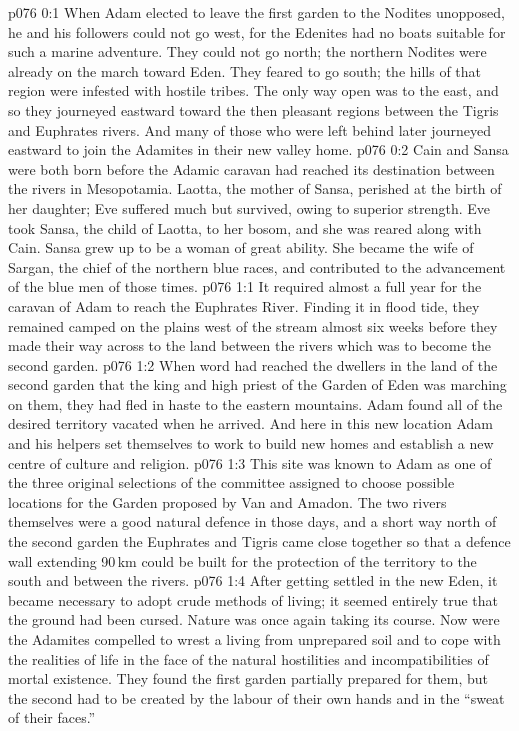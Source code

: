 \author{Solonia}
\vs p076 0:1 When Adam elected to leave the first garden to the Nodites unopposed, he and his followers could not go west, for the Edenites had no boats suitable for such a marine adventure. They could not go north; the northern Nodites were already on the march toward Eden. They feared to go south; the hills of that region were infested with hostile tribes. The only way open was to the east, and so they journeyed eastward toward the then pleasant regions between the Tigris and Euphrates rivers. And many of those who were left behind later journeyed eastward to join the Adamites in their new valley home.
\vs p076 0:2 \pc Cain and Sansa were both born before the Adamic caravan had reached its destination between the rivers in Mesopotamia. Laotta, the mother of Sansa, perished at the birth of her daughter; Eve suffered much but survived, owing to superior strength. Eve took Sansa, the child of Laotta, to her bosom, and she was reared along with Cain. Sansa grew up to be a woman of great ability. She became the wife of Sargan, the chief of the northern blue races, and contributed to the advancement of the blue men of those times.
\vs p076 1:1 It required almost a full year for the caravan of Adam to reach the Euphrates River. Finding it in flood tide, they remained camped on the plains west of the stream almost six weeks before they made their way across to the land between the rivers which was to become the second garden.
\vs p076 1:2 When word had reached the dwellers in the land of the second garden that the king and high priest of the Garden of Eden was marching on them, they had fled in haste to the eastern mountains. Adam found all of the desired territory vacated when he arrived. And here in this new location Adam and his helpers set themselves to work to build new homes and establish a new centre of culture and religion.
\vs p076 1:3 This site was known to Adam as one of the three original selections of the committee assigned to choose possible locations for the Garden proposed by Van and Amadon. The two rivers themselves were a good natural defence in those days, and a short way north of the second garden the Euphrates and Tigris came close together so that a defence wall extending 90\,km could be built for the protection of the territory to the south and between the rivers.
\vs p076 1:4 \pc After getting settled in the new Eden, it became necessary to adopt crude methods of living; it seemed entirely true that the ground had been cursed. Nature was once again taking its course. Now were the Adamites compelled to wrest a living from unprepared soil and to cope with the realities of life in the face of the natural hostilities and incompatibilities of mortal existence. They found the first garden partially prepared for them, but the second had to be created by the labour of their own hands and in the “sweat of their faces.”
